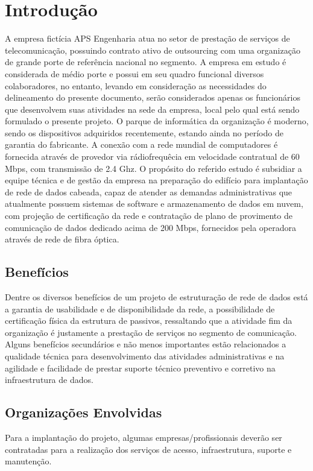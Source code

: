 \documentclass[	DIV=calc,%
							paper=a4,%
							fontsize=12pt,%
							onecolumn]{scrartcl}	 					%
\begin{document}
\section{Introdução}
A empresa fictícia APS Engenharia atua no setor de prestação de serviços de telecomunicação, possuindo contrato ativo de outsourcing com uma organização de grande porte de referência nacional no segmento. A empresa em estudo é considerada de médio porte e possui em seu quadro funcional diversos colaboradores, no entanto, levando em consideração as necessidades do delineamento do presente documento, serão considerados apenas os funcionários que desenvolvem suas atividades na sede da empresa, local pelo qual está sendo formulado o presente projeto.
O parque de informática da organização é moderno, sendo os dispositivos adquiridos recentemente, estando ainda no período de garantia do fabricante. A conexão com a rede mundial de computadores é fornecida através de provedor via rádiofrequêcia em velocidade contratual de 60 Mbps, com transmissão de 2.4 Ghz. 
O propósito do referido estudo é subsidiar a equipe técnica e de gestão da empresa na preparação do edifício para implantação de rede de dados cabeada, capaz de atender as demandas administrativas que atualmente possuem sistemas de software e armazenamento de dados em nuvem, com projeção de certificação da rede e contratação de plano de provimento de comunicação de dados dedicado acima de 200 Mbps, fornecidos pela operadora através de rede de fibra óptica.


\subsection{Benefícios}
Dentre os diversos benefícios de um projeto de estruturação de rede de dados está a garantia de usabilidade e de disponibilidade da rede, a possibilidade de certificação física da estrutura de passivos, ressaltando que a atividade fim da organização é justamente a prestação de serviços no segmento de comunicação. Alguns benefícios secundários e não menos importantes estão relacionados a qualidade técnica para desenvolvimento das atividades administrativas e na agilidade e facilidade de prestar suporte técnico preventivo e corretivo na infraestrutura de dados.

\subsection{Organizações Envolvidas}
Para a implantação do projeto, algumas empresas/profissionais deverão ser contratadas para a realização dos serviços de acesso, infraestrutura, suporte e manutenção. 
\end{document}
